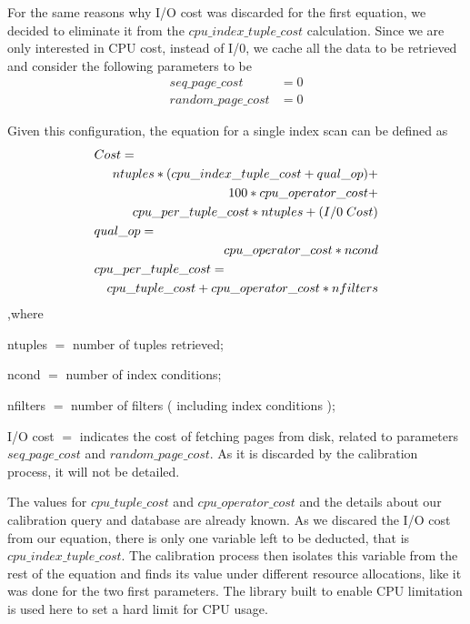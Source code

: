 \documentclass[jidm,a4paper]{jidm} %
\begin{document}
For the same reasons why I/O cost was discarded for the first equation, we decided to eliminate it from the $cpu\_index\_tuple\_cost$ calculation. Since we are only interested in CPU cost, instead of I/0, we cache all the data to be retrieved and consider the following parameters to be
\begin{equation}
 \begin{split}
  seq\_page\_cost &= 0 \\
  random\_page\_cost &= 0
 \end{split}
\end{equation}

Given this configuration, the equation for a single index scan can be defined as
\begin{eqnarray*}
  \lefteqn{Cost=} \\
  &&ntuples * ( cpu\_index\_tuple\_cost + qual\_op ) + \\
  &&100*cpu\_operator\_cost + \\
  &&cpu\_per\_tuple\_cost * ntuples + ( I/0\;Cost ) \\
  \lefteqn{qual\_op=} \\
  &&cpu\_operator\_cost * ncond \\
  \lefteqn{cpu\_per\_tuple\_cost=} \\
  &&cpu\_tuple\_cost + cpu\_operator\_cost * nfilters
\end{eqnarray*}
,where
\begin{description}
 \item ntuples $=$ number of tuples retrieved;
 \item ncond $=$ number of index conditions;
 \item nfilters $=$ number of filters ( including index conditions );
 \item I/O cost $=$ indicates the cost of fetching pages from disk, related to parameters $seq\_page\_cost$ and $random\_page\_cost$. As it is discarded by the calibration process, it will not be detailed.
\end{description}

The values for $cpu\_tuple\_cost$ and $cpu\_operator\_cost$ and the details about our calibration query and database are already known. As we discared the I/O cost from our equation, there is only one variable left to be deducted, that is $cpu\_index\_tuple\_cost$. The calibration process then isolates this variable from the rest of the equation and finds its value under different resource allocations, like it was done for the two first parameters. The library built to enable CPU limitation is used here to set a hard limit for CPU usage.
\end{document}

